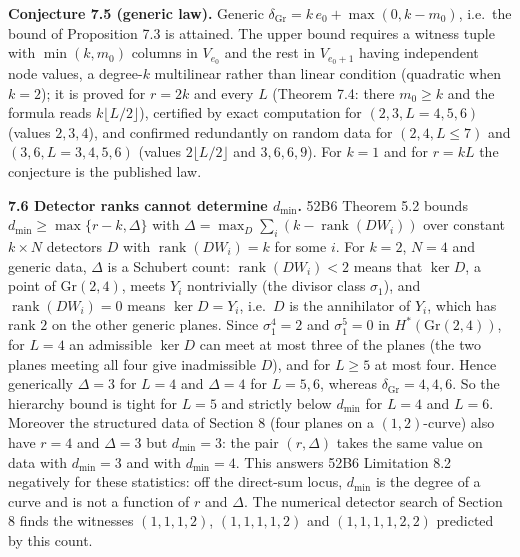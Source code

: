 \documentclass[
  11pt,
  a4paper,
]{article}
\begin{document}
\textbf{Conjecture 7.5 (generic law).} Generic
\(\delta_{\mathrm{Gr}}=k\,\allowbreak{}e_0+\max(0,\allowbreak{}k-m_0)\), i.e.~the bound of
Proposition 7.3 is attained. The upper bound requires a witness tuple
with \(\min(k,\allowbreak{}m_0)\) columns in \(V_{e_0}\) and the rest in
\(V_{e_0+1}\) having independent node values, a degree-\(k\) multilinear
rather than linear condition (quadratic when \(k=2\)); it is proved for
\(r=2k\) and every \(L\) (Theorem 7.4: there \(m_0\ge k\) and the
formula reads \(k\lfloor L/2\rfloor\)), certified by exact computation
for \((2,\allowbreak{}3,\allowbreak{}L=4,\allowbreak{}5,\allowbreak{}6)\) (values \(2,\allowbreak{}3,\allowbreak{}4\)), and confirmed redundantly on
random data for \((2,\allowbreak{}4,\allowbreak{}L\le7)\) and \((3,\allowbreak{}6,\allowbreak{}L=3,\allowbreak{}4,\allowbreak{}5,\allowbreak{}6)\) (values
\(2\lfloor L/2\rfloor\) and \(3,\allowbreak{}6,\allowbreak{}6,\allowbreak{}9\)). For \(k=1\) and for \(r=kL\)
the conjecture is the published law.

\textbf{7.6 Detector ranks cannot determine \(d_{\min}\).} 52B6 Theorem
5.2 bounds \(d_{\min}\ge\max\{r-k,\allowbreak{}\Delta\}\) with
\(\Delta=\max_D\sum_i(k-\operatorname{rank}(DW_i))\) over constant
\(k\times N\) detectors \(D\) with \(\operatorname{rank}(DW_i)=k\) for
some \(i\). For \(k=2\), \(N=4\) and generic data, \(\Delta\) is a
Schubert count: \(\operatorname{rank}(DW_i)<2\) means that \(\ker D\), a
point of \(\mathrm{Gr}(2,\allowbreak{}4)\), meets \(Y_i\) nontrivially (the divisor
class \(\sigma_1\)), and \(\operatorname{rank}(DW_i)=0\) means
\(\ker D=Y_i\), i.e.~\(D\) is the annihilator of \(Y_i\), which has rank
\(2\) on the other generic planes. Since \(\sigma_1^4=2\) and
\(\sigma_1^5=0\) in \(H^*(\mathrm{Gr}(2,\allowbreak{}4))\), for \(L=4\) an admissible
\(\ker D\) can meet at most three of the planes (the two planes meeting
all four give inadmissible \(D\)), and for \(L\ge5\) at most four. Hence
generically \(\Delta=3\) for \(L=4\) and \(\Delta=4\) for \(L=5,\allowbreak{}6\),
whereas \(\delta_{\mathrm{Gr}}=4,\allowbreak{}4,\allowbreak{}6\). So the hierarchy bound is tight
for \(L=5\) and strictly below \(d_{\min}\) for \(L=4\) and \(L=6\).
Moreover the structured data of Section 8 (four planes on a
\((1,\allowbreak{}2)\)-curve) also have \(r=4\) and \(\Delta=3\) but \(d_{\min}=3\):
the pair \((r,\allowbreak{}\Delta)\) takes the same value on data with \(d_{\min}=3\)
and with \(d_{\min}=4\). This answers 52B6 Limitation 8.2 negatively for
these statistics: off the direct-sum locus, \(d_{\min}\) is the degree
of a curve and is not a function of \(r\) and \(\Delta\). The numerical
detector search of Section 8 finds the witnesses \((1,\allowbreak{}1,\allowbreak{}1,\allowbreak{}2)\),
\((1,\allowbreak{}1,\allowbreak{}1,\allowbreak{}1,\allowbreak{}2)\) and \((1,\allowbreak{}1,\allowbreak{}1,\allowbreak{}1,\allowbreak{}2,\allowbreak{}2)\) predicted by this count.
\end{document}

